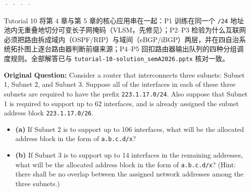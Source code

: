 

 ·  ·  ·  · 


Tutorial 10 将第 4 章与第 5 章的核心应用串在一起：P1 训练在同一个 \texttt{/24} 地址池内无重叠地切分可变长子网掩码（VLSM，先修见）；P2–P3 检验为什么互联网必须把路由拆成域内（OSPF/RIP）与域间（eBGP/iBGP）两层，并在四自治系统拓扑图上逐台路由器判断前缀来源；P4–P5 回扣路由器输出队列的四种分组调度规则。全部解答已与 \texttt{tutorial-10-solution\_semA2026.pptx} 核对一致。



\textbf{Original Question:} Consider a router that interconnects three subnets: Subnet 1, Subnet 2, and Subnet 3. Suppose all of the interfaces in each of these three subnets are required to have the prefix \texttt{223.1.17.0/24}. Also suppose that Subnet 1 is required to support up to 62 interfaces, and is already assigned the subnet address block \texttt{223.1.17.0/26}.
\begin{itemize}
\item \textbf{(a)} If Subnet 2 is to support up to 106 interfaces, what will be the allocated address block in the form of \texttt{a.b.c.d/x}?
\item \textbf{(b)} If Subnet 3 is to support up to 14 interfaces in the remaining addresses, what will be the allocated address block in the form of \texttt{a.b.c.d/x}? (Hint: there shall be no overlap between the assigned network addresses among the three subnets.)
\end{itemize}

